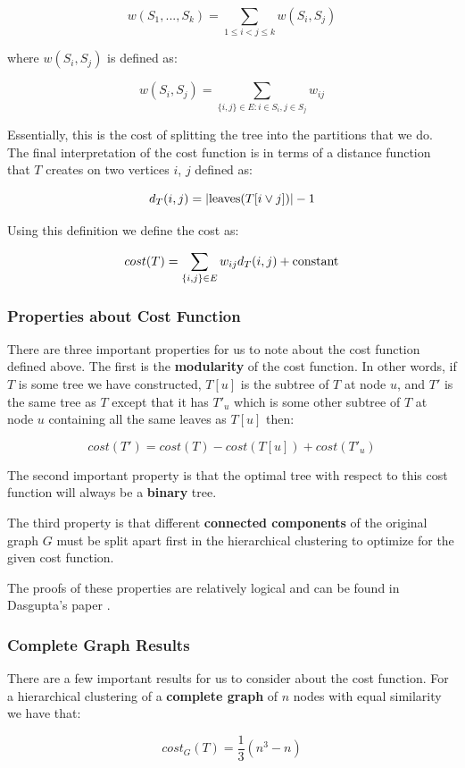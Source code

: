 $$w(S_1, ..., S_k) = \sum_{1 \leq i < j \leq k} w(S_i, S_j)$$

where $w(S_i, S_j)$ is defined as:

$$w(S_i, S_j) = \sum_{\{i, j\} \in E: i \in S_i, j \in S_j} w_{ij}$$

Essentially, this is the cost of splitting the tree into the partitions that we do. The final interpretation of the cost function is in terms of a distance function that $T$ creates on two vertices $i$, $j$ defined as:

$$d_T(i, j) = |\hbox{leaves}(T[i \vee j])| - 1$$

Using this definition we define the cost as:

$$cost(T) = \sum_{\{i, j\} \in E}w_{ij}d_T(i, j) + \hbox{constant}$$

\subsubsection{Properties about Cost Function}
There are three important properties for us to note about the cost function defined above. The first is the \textbf{modularity} of the cost function. In other words, if $T$ is some tree we have constructed, $T[u]$ is the subtree of $T$ at node $u$, and $T'$ is the same tree as $T$ except that it has $T'_u$ which is some other subtree of $T$ at node $u$ containing all the same leaves as $T[u]$ then:

$$cost(T') = cost(T) - cost(T[u]) + cost(T'_u)$$

The second important property is that the optimal tree with respect to this cost function will always be a \textbf{binary} tree.

The third property is that different \textbf{connected components} of the original graph $G$ must be split apart first in the hierarchical clustering to optimize for the given cost function.

The proofs of these properties are relatively logical and can be found in Dasgupta's paper \cite{das2016}. 


\subsubsection{Complete Graph Results}

There are a few important results for us to consider about the cost function. For a hierarchical clustering of a \textbf{complete graph} of $n$ nodes with equal similarity we have that:


$$cost_G(T) = \frac{1}{3}(n^3 - n)$$

